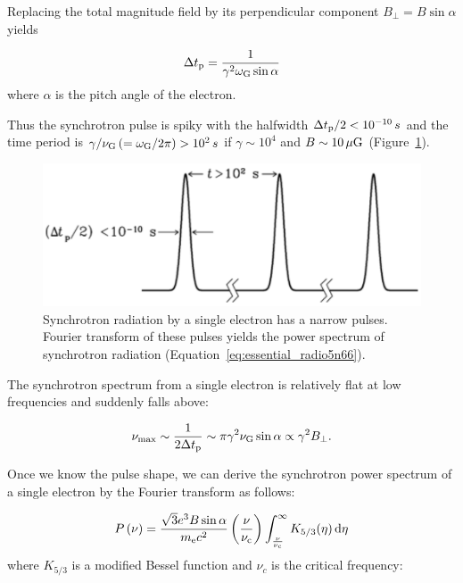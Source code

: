 Replacing the total magnitude field by its perpendicular component $B_{\perp} = B\sin\alpha$ yields

\begin{equation}\label{eq:essential_radio5n60}
    \Delta t_{\mathrm{p}} = \frac{1}{\gamma^2 \omega_{\mathrm{G}} \sin \alpha}
\end{equation}
where $\alpha$ is the pitch angle of the electron.

Thus the synchrotron pulse is spiky with the halfwidth $\Delta t_{\mathrm{p}}/2 < 10^{-10}\,s$ and the time period is $\gamma/ \nu_{\mathrm{G}} \left(=\omega_{\mathrm{G}} / 2\pi\right) > 10^2\,s$ if $\gamma \sim 10^4$ and $B \sim 10\,\mathrm{\mu G}$ (Figure~\ref{fig:nrao_radio5n5}).

\begin{figure}[htbp]
	\centering
	\includegraphics[width=.7\linewidth]{Chapter_2/Figures/NRAO_radio5n5.png}
    \caption[Synchrotron pulse by a single electron]{\label{fig:nrao_radio5n5}
        Synchrotron radiation by a single electron has a narrow pulses.
        Fourier transform of these pulses yields the power spectrum of synchrotron radiation (Equation~\ref{eq:essential_radio5n66}).
    }
\end{figure}


The synchrotron spectrum from a single electron is relatively flat at low frequencies and suddenly falls above:

\begin{equation}\label{eq:essential_radio5n65}
    \nu_{\max} \sim \frac{1}{2 \Delta t_{\mathrm{p}}} \sim \pi \gamma^2 \nu_{\mathrm{G}} \sin \alpha \propto \gamma^2 B_{\perp}.
\end{equation}

Once we know the pulse shape, we can derive the synchrotron power spectrum of a single electron by the Fourier transform as follows:

\begin{equation}\label{eq:essential_radio5n66}
    P\left(\nu\right) = \frac{\sqrt{3} e^3 B \sin \alpha}{m_{\mathrm{e}} c^2}\left(\frac{\nu}{\nu_{\mathrm{c}}}\right) \int_{\frac{\nu}{\nu_{\mathrm{c}}}}^{\infty} K_{5/3}(\eta)\,\mathrm{d}\eta
\end{equation}
 where $K_{5/3}$ is a modified Bessel function and $\nu_c$ is the critical frequency:

